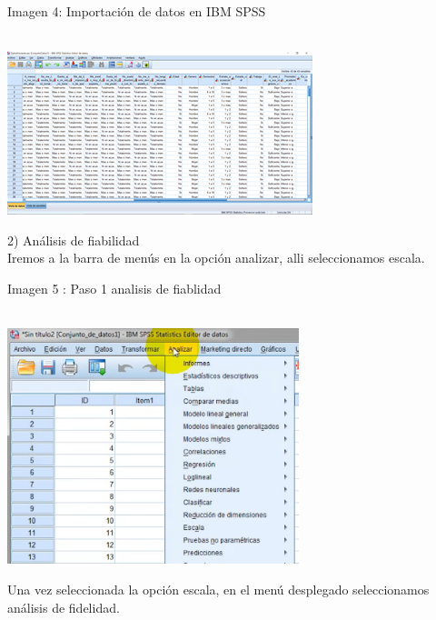 \documentclass[conference]{IEEEtran}
\begin{document}
\begin{center}
\caption{Imagen 4: Importación de datos en IBM SPSS}\\
\includegraphics[scale=1]{imagenes/4.png}
\end{center}
2) Análisis de fiabilidad\\ Iremos a la barra de menús en la opción analizar, alli seleccionamos escala.\\

\begin{center}
\caption{Imagen 5 : Paso 1 analisis de fiablidad}\\
\includegraphics[width=8.5cm]{imagenes/Paso5}
\end{center}

Una vez seleccionada la opción escala, en el menú desplegado seleccionamos análisis de fidelidad.\\
\end{document}
